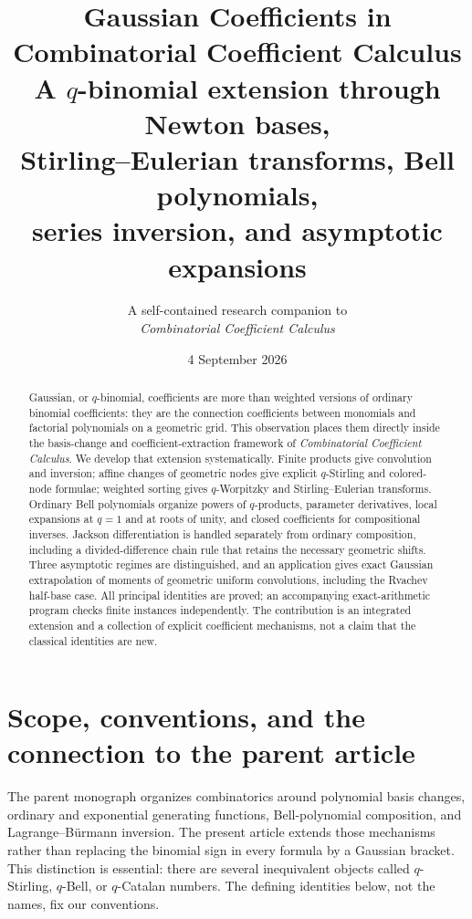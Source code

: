 \documentclass[11pt,a4paper]{article}
\title{\Huge\bfseries Gaussian Coefficients in\\[2mm]
Combinatorial Coefficient Calculus\\[5mm]
\Large A $q$-binomial extension through Newton bases,\\
Stirling--Eulerian transforms, Bell polynomials,\\
series inversion, and asymptotic expansions}
\author{A self-contained research companion to\\\emph{Combinatorial Coefficient Calculus}}
\date{4 September 2026}
\numberwithin{equation}{section}
\theoremstyle{definition}
\theoremstyle{remark}
\begin{document}
\maketitle
\begin{abstract}
Gaussian, or $q$-binomial, coefficients are more than weighted versions of
ordinary binomial coefficients: they are the connection coefficients between
monomials and factorial polynomials on a geometric grid. This observation
places them directly inside the basis-change and coefficient-extraction
framework of \emph{Combinatorial Coefficient Calculus}. We develop that
extension systematically. Finite products give convolution and inversion;
affine changes of geometric nodes give explicit $q$-Stirling and colored-node
formulae; weighted sorting gives $q$-Worpitzky and Stirling--Eulerian
transforms. Ordinary Bell polynomials organize powers of $q$-products,
parameter derivatives, local expansions at $q=1$ and at roots of unity, and
closed coefficients for compositional inverses. Jackson differentiation is
handled separately from ordinary composition, including a divided-difference
chain rule that retains the necessary geometric shifts. Three asymptotic
regimes are distinguished, and an application gives exact Gaussian
extrapolation of moments of geometric uniform convolutions, including the
Rvachev half-base case. All principal identities are proved; an accompanying
exact-arithmetic program checks finite instances independently. The
contribution is an integrated extension and a collection of explicit
coefficient mechanisms, not a claim that the classical identities are new.
\end{abstract}
\thispagestyle{plain}
\clearpage
\setcounter{tocdepth}{1}
\hypersetup{bookmarksdepth=2}
\tableofcontents
\clearpage

\section{Scope, conventions, and the connection to the parent article}
\label{sec:scope}
The parent monograph \cite{parent} organizes combinatorics around polynomial
basis changes, ordinary and exponential generating functions, Bell-polynomial
composition, and Lagrange--B\"urmann inversion. The present article extends
those mechanisms rather than replacing the binomial sign in every formula
by a Gaussian bracket. This distinction is essential: there are several
inequivalent objects called $q$-Stirling, $q$-Bell, or $q$-Catalan numbers.
The defining identities below, not the names, fix our conventions.
\end{document}
